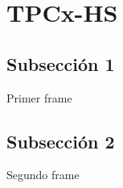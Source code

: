 
\section{TPCx-HS}

	\subsection*{Subsección 1}

		\begin{frame}{Primer frame}

		\end{frame}
	
	\subsection*{Subsección 2}	

		\begin{frame}{Segundo frame}
				
		\end{frame}
				 
